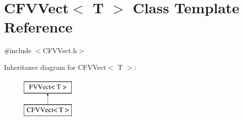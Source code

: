 \hypertarget{classFVL_1_1CFVVect}{
\section{CFVVect$<$ T $>$ Class Template Reference}
\label{db/da6/classFVL_1_1CFVVect}
}


{\ttfamily \#include $<$CFVVect.h$>$}

Inheritance diagram for CFVVect$<$ T $>$:\begin{figure}[H]
\begin{center}
\leavevmode
\includegraphics[height=2.000000cm]{db/da6/classFVL_1_1CFVVect}
\end{center}
\end{figure}
